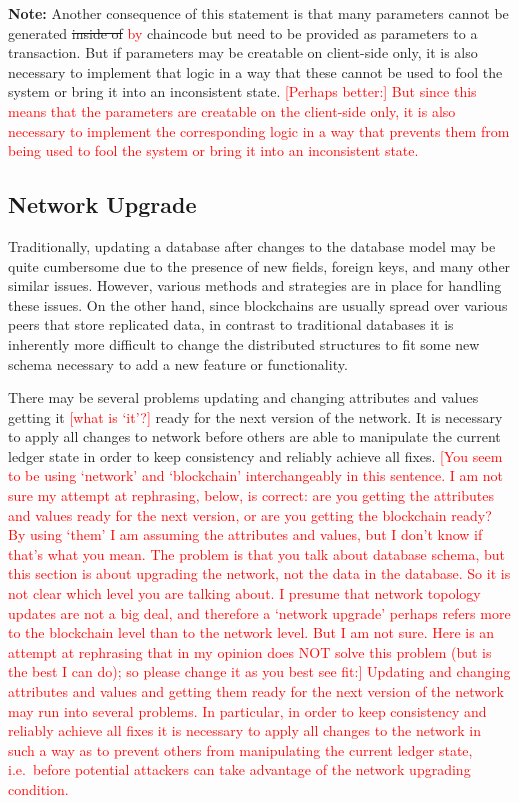 \textbf{Note:} Another consequence of this statement is that many parameters cannot be generated \st{inside of} \textcolor{red}{by} chaincode but need to be provided as parameters to a transaction. But if parameters may be creatable on client-side only, it is also necessary to implement that logic in a way that these cannot be used to fool the system or bring it into an inconsistent state. \textcolor{red}{[Perhaps better:] But since this means that the parameters are creatable on the client-side only, it is also necessary to implement the corresponding logic in a way that prevents them from being used to fool the system or bring it into an inconsistent state.} 

\subsection{Network Upgrade}

Traditionally, updating a database after changes to the database model may be quite cumbersome due to the presence of new fields, foreign keys, and many other similar issues. However, various methods and strategies are in place for handling these issues.
On the other hand, since blockchains are usually spread over various peers that store replicated data, in contrast to traditional databases it is inherently more difficult to change the distributed structures to fit some new schema necessary to add a new feature or functionality.

There may be several problems updating and changing attributes and values getting it \textcolor{red}{[what is `it'?]} ready for the next version of the network. It is necessary to apply all changes to network before others are able to manipulate the current ledger state in order to keep consistency and reliably achieve all fixes. \textcolor{red}{[You seem to be using `network' and `blockchain' interchangeably in this sentence. I am not sure my attempt at rephrasing, below, is correct: are you getting the attributes and values ready for the next version, or are you getting the blockchain ready? By using `them' I am assuming the attributes and values, but I don't know if that's what you mean. The problem is that you talk about database schema, but this section is about upgrading the network, not the data in the database. So it is not clear which level you are talking about. I presume that network topology updates are not a big deal, and therefore a `network upgrade' perhaps refers more to the blockchain level than to the network level. But I am not sure. Here is an attempt at rephrasing that in my opinion does NOT solve this problem (but is the best I can do); so please change it as you best see fit:] Updating and changing attributes and values and getting them ready for the next version of the network may run into several problems. In particular, in order to keep consistency and reliably achieve all fixes it is necessary to apply all changes to the network in such a way as to prevent others from manipulating the current ledger state, i.e.\ before potential attackers can take advantage of the network upgrading condition.}

